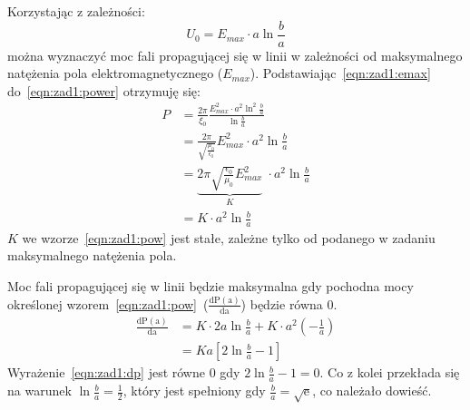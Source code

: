 \documentclass[rep.tex]{subfiles}
\begin{document}
Korzystając z zależności:
\begin{equation}
  U_0 = E_{max}\cdot a \ln\frac{b}{a} \label{eqn:zad1:emax}
\end{equation}
można wyznaczyć moc fali propagującej się w linii w zależności od maksymalnego natężenia pola elektromagnetycznego ($E_{max}$).
Podstawiając~\ref{eqn:zad1:emax} do~\ref{eqn:zad1:power} otrzymuję się:
\begin{align}
  P &= \frac{2\pi}{\xi_0}\frac{E_{max}^2 \cdot a^2 \ln^2\frac{b}{a}}{\ln\frac{b}{a}} \nonumber \\
    &= \frac{2\pi}{\sqrt{\frac{\mu_0}{\epsilon_0}}}E_{max}^2 \cdot a^2 \ln\frac{b}{a} \nonumber \\
    &= \underbrace{2\pi\sqrt{\frac{\epsilon_0}{\mu_0}}E_{max}^2}_K \; \cdot a^2 \ln\frac{b}{a} \nonumber \\
    &= K \cdot a^2 \ln\frac{b}{a} \label{eqn:zad1:pow}
\end{align}
$K$ we wzorze~\ref{eqn:zad1:pow} jest stałe, zależne tylko od podanego w zadaniu maksymalnego natężenia pola.

Moc fali propagującej się w linii będzie maksymalna gdy pochodna mocy określonej wzorem~\ref{eqn:zad1:pow}~($\frac{\mathrm{dP(a)}}{\mathrm{da}}$)
będzie równa $0$.
\begin{align}
  \frac{\mathrm{dP(a)}}{\mathrm{da}} &= K \cdot 2a\ln\frac{b}{a} + K \cdot a^2(-\frac{1}{a}) \nonumber \\
    &= Ka[2\ln\frac{b}{a} - 1] \label{eqn:zad1:dp}
\end{align}
Wyrażenie~\ref{eqn:zad1:dp} jest równe $0$ gdy $2\ln\frac{b}{a} - 1 = 0$.
Co z kolei przekłada się na warunek $\ln\frac{b}{a} = \frac{1}{2}$, który jest spełniony gdy $\frac{b}{a} = \sqrt{\mathrm{e}}$,
co należało dowieść.
\end{document}

